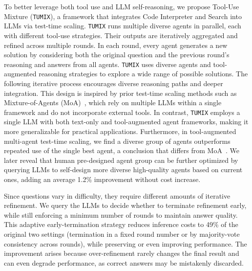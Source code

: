 To better leverage both tool use and LLM self-reasoning, we propose Tool-Use Mixture (\texttt{TUMIX}), a framework that integrates Code Interpreter and Search into LLMs via test-time scaling. \texttt{TUMIX} runs multiple diverse agents in parallel, each with different tool-use strategies. Their outputs are iteratively aggregated and refined across multiple rounds. In each round, every agent generates a new solution by considering both the original question and the previous round’s reasoning and answers from all agents. \texttt{TUMIX} uses diverse agents and tool-augmented reasoning strategies to explore a wide range of possible solutions. The following iterative process encourages diverse reasoning paths and deeper integration. This design is inspired by prior test-time scaling methods such as Mixture-of-Agents (MoA)~\citep{MOA}, which rely on multiple LLMs within a single framework and do not incorporate external tools. In contrast, \texttt{TUMIX} employs a single LLM with both text-only and tool-augmented agent frameworks, making it more generalizable for practical applications. Furthermore, in tool-augmented multi-agent test-time scaling, we find a diverse group of agents outperforms repeated use of the single best agent, a conclusion that differs from MoA~\citep{rethink-MOA}. We later reveal that human pre-designed agent group can be further optimized by querying LLMs to self-design more diverse high-quality agents based on current ones, adding an average 1.2\% improvement without cost increase.

Since questions vary in difficulty, they require different amounts of iterative refinement. We query the LLMs to decide whether to terminate refinement early, while still enforcing a minimum number of rounds to maintain answer quality. This adaptive early-termination strategy reduces inference costs to 49\% of the original two settings (termination in a fixed round number or by majority-vote consistency across rounds), while preserving or even improving performance. The improvement arises because over-refinement rarely changes the final result and can even degrade performance, as correct answers may be mistakenly discarded.


